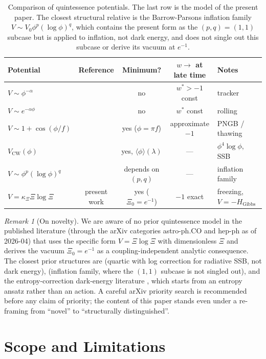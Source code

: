 \documentclass[11pt,reqno]{amsart}
\theoremstyle{plain}
\theoremstyle{definition}
\theoremstyle{remark}
\newtheorem*{remark}{Remark}
\newcommand{\Gibbs}{\mathrm{Gibbs}}
\begin{document}
\begin{table}[h]
\small
\begin{tabular}{l|c|c|c|l}
Potential & Reference & Minimum? & $w\to$ at late time & Notes\\
\hline
$V\sim\phi^{-\alpha}$ & \cite{RatraPeebles1988} & no & $w^{*}>-1$ const & tracker\\
$V\sim e^{-\alpha\phi}$ & \cite{Wetterich1988} & no & $w^{*}$ const & rolling\\
$V\sim 1+\cos(\phi/f)$ & \cite{Frieman1995} & yes ($\phi=\pi f$) & approximate $-1$ & PNGB / thawing\\
$V_\text{CW}(\phi)$ & \cite{ColemanWeinberg1973} & yes, $\langle\phi\rangle(\lambda)$ & — & $\phi^4\log\phi$, SSB\\
$V\sim\phi^p(\log\phi)^q$ & \cite{BarrowParsons1995} & depends on $(p,q)$ & — & inflation family\\
$\boxed{V=\kappa_\Xi\Xi\log\Xi}$ & present work & yes ($\Xi_0=e^{-1}$) & $-1$ exact & freezing, $V=-H_{\Gibbs}$
\end{tabular}
\caption{Comparison of quintessence potentials. The last row is the model of the present
paper. The closest structural relative is the Barrow-Parsons inflation family
\cite{BarrowParsons1995} $V\sim V_0\phi^{p}(\log\phi)^{q}$, which contains the
present form as the $(p,q)=(1,1)$ subcase but is applied to inflation, not dark
energy, and does not single out this subcase or derive its vacuum at $e^{-1}$.}
\label{tab:compare}
\end{table}

\begin{remark}[On novelty]
We are aware of no prior quintessence model in the published literature
(through the arXiv categories astro-ph.CO and hep-ph as of 2026-04) that
uses the specific form $V=\Xi\log\Xi$ with dimensionless $\Xi$ and derives
the vacuum $\Xi_0=e^{-1}$ as a coupling-independent analytic consequence. The
closest prior structures are \cite{ColemanWeinberg1973} (quartic with log
correction for radiative SSB, not dark energy), \cite{BarrowParsons1995}
(inflation family, where the $(1,1)$ subcase is not singled out), and the
entropy-correction dark-energy literature \cite{CHLZ2012}, which starts from
an entropy ansatz rather than an action. A careful arXiv priority search is
recommended before any claim of priority; the content of this paper stands
even under a re-framing from ``novel'' to ``structurally distinguished''.
\end{remark}

\section{Scope and Limitations}\label{sec:scope}
\end{document}
